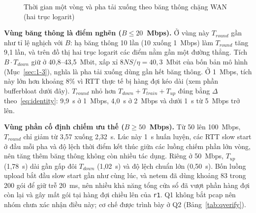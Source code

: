 \begin{figure}[H]
    \centering
    \caption{Thời gian một vòng và pha tải xuống theo băng thông chặng WAN (hai trục logarit)}
    \label{fig:q1bw}
\end{figure}

\textbf{Vùng băng thông là điểm nghẽn ($B \le 20$~Mbps).} Ở vùng này $T_{round}$ gần như tỉ lệ nghịch với $B$: hạ băng thông 10 lần (10 xuống 1~Mbps) làm $T_{round}$ tăng 9{,}1 lần, và trên đồ thị hai trục logarit các điểm nằm gần một đường thẳng. Tích $B \cdot T_{down}$ giữ ở 40{,}8--43{,}5~Mbit, xấp xỉ $8NS/\eta = 40{,}3$~Mbit của bốn bản mô hình (Mục~\ref{sec:1-3}), nghĩa là pha tải xuống dùng gần hết băng thông. Ở 1~Mbps, tích này lớn hơn khoảng 8\% vì RTT thực tế bị hàng đợi kéo dài (xem phần bufferbloat dưới đây). $T_{round}$ nhỏ hơn $T_{down} + T_{train} + T_{up}$ đúng bằng $\Delta$ theo~\eqref{eq:identity}: 9{,}9~s ở 1~Mbps, 4{,}0~s ở 2~Mbps và dưới 1~s từ 5~Mbps trở lên.

\textbf{Vùng phần cố định chiếm ưu thế ($B \ge 50$~Mbps).} Từ 50 lên 100~Mbps, $T_{round}$ chỉ giảm từ 3{,}57 xuống 2{,}32~s. Lúc này 1~s huấn luyện, các RTT slow start ở đầu mỗi pha và độ lệch thời điểm kết thúc giữa các luồng chiếm phần lớn vòng, nên tăng thêm băng thông không còn nhiều tác dụng. Riêng ở 50~Mbps, $T_{up}$ (1{,}78~s) dài gần gấp đôi $T_{down}$ (1{,}02~s) và độ lệch chuẩn lớn (0{,}50~s). Bốn luồng upload bắt đầu slow start gần như cùng lúc, và netem đã dùng khoảng 83 trong 200 gói để giữ trễ 20~ms, nên nhiều khả năng tổng cửa sổ đã vượt phần hàng đợi còn lại và gây mất gói tại hàng đợi chiều lên của \texttt{r1}. Q1 không bắt pcap nên nhóm chưa xác nhận điều này; cơ chế được trình bày ở Q2 (Bảng~\ref{tab:qverify}).

